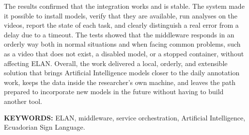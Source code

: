 The results confirmed that the integration works and is stable. The system made it possible to install models, verify that they are available, run analyses on the videos, report the state of each task, and clearly distinguish a real error from a delay due to a timeout. The tests showed that the middleware responds in an orderly way both in normal situations and when facing common problems, such as a video that does not exist, a disabled model, or a stopped container, without affecting ELAN. Overall, the work delivered a local, orderly, and extensible solution that brings Artificial Intelligence models closer to the daily annotation work, keeps the data inside the researcher's own machine, and leaves the path prepared to incorporate new models in the future without having to build another tool.

\textbf{KEYWORDS:} ELAN, middleware, service orchestration, Artificial Intelligence, Ecuadorian Sign Language.
